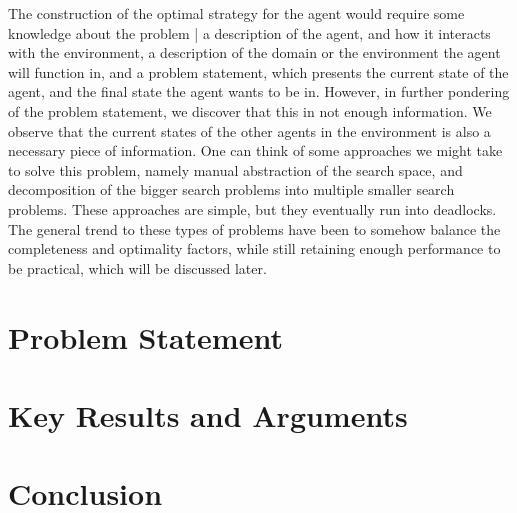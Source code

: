 The construction of the optimal strategy for the agent would require some knowledge about the problem | a description of the agent, and how it interacts with the environment, a description of the domain or the environment the agent will function in, and a problem statement, which presents the current state of the agent, and the final state the agent wants to be in. However, in further pondering of the problem statement, we discover that this in not enough information. We observe that the current states of the other agents in the environment is also a necessary piece of information. One can think of some approaches we might take to solve this problem, namely manual abstraction of the search space, and decomposition of the bigger search problems into multiple smaller search problems. These approaches are simple, but they eventually run into deadlocks. The general trend to these types of problems have been to somehow balance the completeness and optimality factors, while still retaining enough performance to be practical, which will be discussed later.
\section{Problem Statement}

\section{Key Results and Arguments}

\section{Conclusion}





